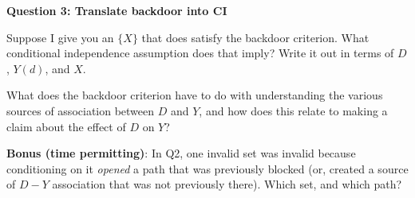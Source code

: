 \documentclass[11pt]{article}
\begin{document}
\newpage

\noindent\textbf{Question 3: Translate backdoor into CI}

\medskip
\noindent Suppose I give you an $\{X\}$ that does satisfy the backdoor criterion.  What conditional independence assumption does that imply?  Write it out in terms of $D$, $Y(d)$, and $X$.

\vspace{2.5cm}

\noindent What does the backdoor criterion have to do with understanding the various sources of association between $D$ and $Y$, and how does this relate to making a claim about the effect of $D$ on $Y$?


\vspace{5cm}

\noindent\textbf{Bonus (time permitting)}: In Q2, one invalid set was invalid because conditioning on it \textit{opened} a path that was previously blocked (or, created a source of $D-Y$ association that was not previously there).   Which set, and which path?

\vspace{3cm}
\end{document}
